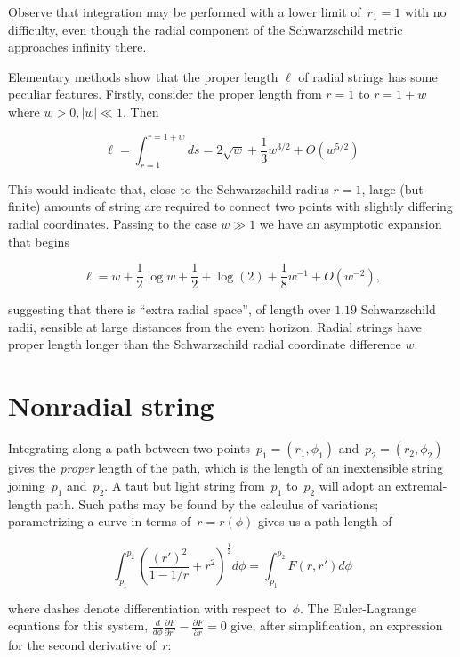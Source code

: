 \documentclass[prb,preprint]{revtex4-1}
\begin{document}
Observe that integration may be performed with a lower limit
of~$r_1=1$ with no difficulty, even though the radial component of the
Schwarzschild metric approaches infinity there.

Elementary methods show that the proper length $\ell$ of radial strings has
some peculiar features.  Firstly, consider the proper length from
$r=1$ to $r=1+w$ where $w>0, \left|w\right|\ll 1$.  Then

\begin{equation}
  \ell=\int_{r=1}^{r=1+w}ds
  =2\sqrt{w} + \frac{1}{3}w^{3/2} + O(w^{5/2})
\end{equation}

This would indicate that, close to the Schwarzschild radius $r=1$,
large (but finite) amounts of string are required to connect two
points with slightly differing radial coordinates.  Passing to the
case $w\gg 1$ we have an asymptotic expansion that begins

\begin{equation}
  \ell = w +  \frac{1}{2}\log w + \frac{1}{2} + \log(2)  +  \frac{1}{8}w^{-1} + O(w^{-2}),
\end{equation}

\noindent suggesting that there is ``extra radial space'', of length
over $1.19$ Schwarzschild radii, sensible at large distances from the
event horizon.  Radial strings have proper length longer than the
Schwarzschild radial coordinate difference $w$.

\section{Nonradial string}
Integrating along a path between two
points~$p_1=\left(r_1,\phi_1\right)$ and~$p_2=\left(r_2,\phi_2\right)$
gives the {\em proper} length of the path, which is the length of an
inextensible string joining~$p_1$ and~$p_2$.  A taut but light string
from~$p_1$ to~$p_2$ will adopt an extremal-length path.  Such paths
may be found by the calculus of variations; parametrizing a curve in
terms of~$r=r\left(\phi\right)$ gives us a path length of

\begin{equation}
  \int_{p_1}^{p_2}\left(\frac{\left(r'\right)^2}{1-1/r} + r^2\right)^\frac{1}{2}d\phi=
  \int_{p_1}^{p_2}F\left(r,r'\right)d\phi
\end{equation}

\noindent where dashes denote differentiation with respect to~$\phi$.  The
Euler-Lagrange equations for this system,
$\frac{d}{d\phi}\frac{\partial F}{\partial r'}-\frac{\partial
  F}{\partial r}=0$ give, after simplification, an expression for the
second derivative of~$r$:
\end{document}
